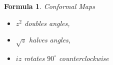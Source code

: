 \documentclass[12pt]{Qual}
\newtheorem{formula}{Formula}
\begin{document}
\begin{formula}{\Large\textit{Conformal Maps}}
\begin{center}
\hspace{2cm}\begin{minipage}{0.5\textwidth}
\begin{itemize}
\renewcommand\labelitemi{\faBug}
    \item $z^2$ doubles angles,
    \item $\sqrt{z}$ halves angles,
    \item $iz$ rotates $90^\circ$ counterclockwise
\end{itemize}
\end{minipage}
\end{center}
\end{formula}
\end{document}
